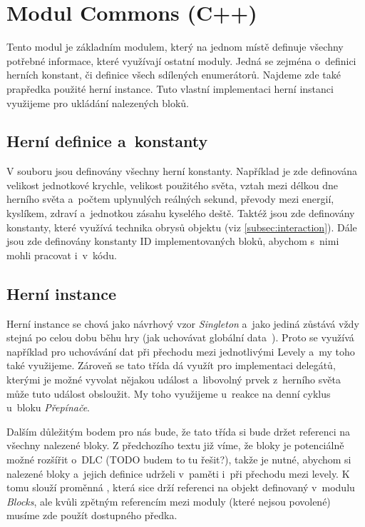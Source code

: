 
\section{Modul Commons (C++)}

Tento modul je základním modulem, který na jednom místě definuje všechny potřebné informace, které využívají ostatní moduly. Jedná se zejména o~definici herních konstant, či definice všech sdílených enumerátorů. Najdeme zde také prapředka použité herní instance. Tuto vlastní implementaci herní instanci využijeme pro ukládání nalezených bloků.

\subsection{Herní definice a~konstanty}



V souboru jsou definovány všechny herní konstanty. Například je zde definována velikost jednotkové krychle, velikost použitého světa, vztah mezi délkou dne herního světa a~počtem uplynulých reálných sekund, převody mezi energií, kyslíkem, zdraví a~jednotkou zásahu kyselého deště. Taktéž jsou zde definovány konstanty, které využívá technika obrysů objektu (viz \ref{subsec:interaction}). Dále jsou zde definovány konstanty ID implementovaných bloků, abychom s~nimi mohli pracovat i~v~kódu.

\subsection{Herní instance}

Herní instance  se chová jako návrhový vzor \textit{Singleton} a~jako jediná zůstává vždy stejná po celou dobu běhu hry (jak uchovávat globální data~\citep{ue_gameInstance}). Proto se využívá například pro uchovávání dat při přechodu mezi jednotlivými Levely a~my toho také využijeme. Zároveň se tato třída dá využít pro implementaci delegátů, kterými je možné vyvolat nějakou událost a~libovolný prvek z~herního světa může tuto událost obsloužit. My toho využijeme u~reakce na denní cyklus u~bloku \textit{Přepínače}.

Dalším důležitým bodem pro nás bude, že tato třída si bude držet referenci na všechny nalezené bloky. Z předchozího textu již víme, že bloky je potenciálně možné rozšířit o~DLC (TODO budem to tu řešit?), takže je nutné, abychom si nalezené bloky a~jejich definice udrželi v~paměti i~při přechodu mezi levely. K tomu slouží proměnná , která sice drží referenci na objekt definovaný v~modulu \textit{Blocks}, ale kvůli zpětným referencím mezi moduly (které nejsou povolené) musíme zde použít dostupného předka.

